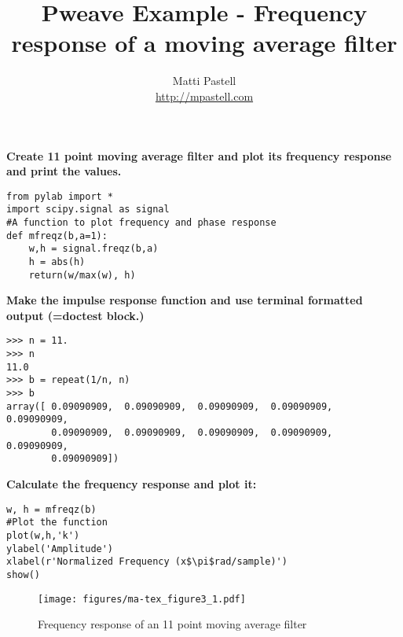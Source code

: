 \documentclass[a4paper,11pt,final]{article}
\begin{document}
\title{Pweave Example - Frequency response of a moving average filter}
\author{Matti Pastell \\
\url{http://mpastell.com}}

\maketitle

\textbf{Create 11 point moving average filter and plot its frequency response and print the values.}


\begin{verbatim}
from pylab import *
import scipy.signal as signal
#A function to plot frequency and phase response
def mfreqz(b,a=1):
    w,h = signal.freqz(b,a)
    h = abs(h)
    return(w/max(w), h)\end{verbatim}


\textbf{Make the impulse response function and use terminal formatted output (=doctest block.)}


\begin{verbatim}
>>> n = 11.
>>> n
11.0
>>> b = repeat(1/n, n)
>>> b
array([ 0.09090909,  0.09090909,  0.09090909,  0.09090909,  0.09090909,
        0.09090909,  0.09090909,  0.09090909,  0.09090909,  0.09090909,
        0.09090909])
\end{verbatim}



\textbf{Calculate the frequency response and plot it:}


\begin{verbatim}
w, h = mfreqz(b)
#Plot the function
plot(w,h,'k')
ylabel('Amplitude')
xlabel(r'Normalized Frequency (x$\pi$rad/sample)')
show()\end{verbatim}
\begin{figure}[htpb]
\center
\texttt{[image: figures/ma-tex\_figure3\_1.pdf]}
\caption{Frequency response of an 11 point moving average filter}
\label{fig:None}
\end{figure}
\end{document}

